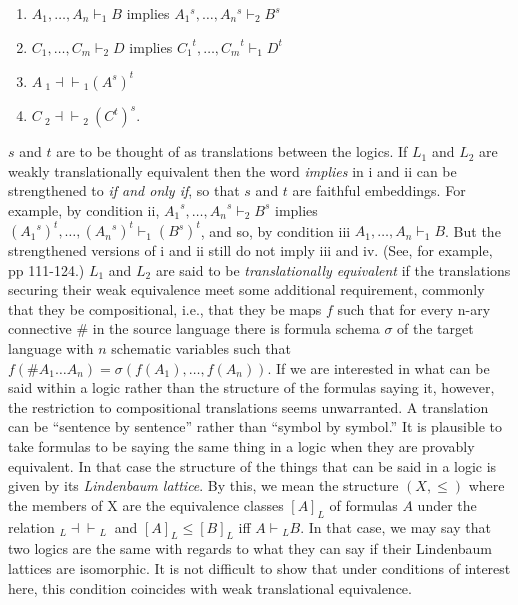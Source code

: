 \documentclass[11pt]{article}
\begin{document}
\begin{enumerate} [label=(\roman*)]
\setlength\itemsep{.2 pt}
\item{$A_1,{\ldots},A_n \vdash_1 B$ implies ${A_1}\!^s,{\ldots},{A_n}\!^s \vdash_2 B^s$}
\item{$C_1,{\ldots},C_m \vdash_2 D$ implies ${C_1}^t,{\ldots},{C_m}^t \vdash_1 D^t$}
\item{$A ~_1\!{\dashv}{\vdash}\!_1 (A^s)^t$}
\item{$C ~_2\!{\dashv}{\vdash}\!_2 ~ (C^t)^s$.}
\end{enumerate}
$s$ and $t$ are to be thought of as translations between the logics. If $L_1$ and $L_2$ are weakly translationally equivalent then the word \textit{implies} in i and ii can be strengthened to \textit{if and only if}, so that $s$ and $t$ are faithful embeddings. For example, by condition ii, ${A_1}^s,{\ldots},{A_n}^s \vdash_2 B^s$ implies $({A_1}^s)^t,{\ldots},({A_n}^s)^t \vdash_1({B^s})^t$, and so, by condition iii $A_1,{\ldots},A_n \vdash_1 B$. But the strengthened versions of i and ii still do not imply iii and iv. (See, for example, \citet{French2010} pp 111-124.) $L_1$ and $L_2$ are said to be \textit{translationally equivalent} if the translations securing their weak equivalence meet some additional requirement,\footnotemark
{}
 commonly that they be compositional, i.e., that they be maps $f$ such that for every n-ary connective $\#$ in the source language there is formula schema $\sigma$ of the target language with $n$ schematic variables such that $f(\#A_1{\ldots}A_n)=\sigma(f(A_1),{\ldots},f(A_n))$. If we are interested in what can be said within a logic rather than the structure of the formulas saying it, however, the restriction to compositional translations seems unwarranted. A translation can be ``sentence by sentence'' rather than ``symbol by symbol.'' It is plausible to take formulas to be saying the same thing in a logic when they are provably equivalent. In that case the structure of the things that can be said in a logic is given by its \textit{Lindenbaum lattice}.\footnotemark
{} By this, we mean the structure $(X,\le )$ where the members of X are the equivalence classes $[A]_L$ of formulas $A$ under the relation $ _L\!{\dashv}{\vdash}\!_L~$ and $[A]_L\le [B]_L$ iff $A\vdash \!_LB$. In that case, we may say that two logics are the same with regards to what they can say if their Lindenbaum lattices are isomorphic. It is not difficult to show that under conditions of interest here, this condition coincides with weak translational equivalence.
\end{document}
